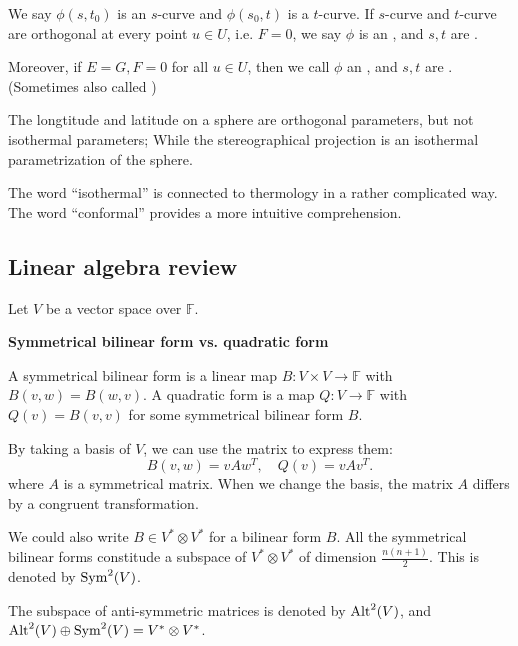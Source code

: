 
We say $\phi(s,t_0)$ is an $s$-curve and $\phi(s_0,t)$ is a $t$-curve.
If $s$-curve and $t$-curve are orthogonal at every point $u\in U$,
i.e. $F = 0$,
we say  $\phi$ is an ,
and $s,t$ are .

Moreover, if $E=G, F=0$ for all  $u\in U$, then we call  $\phi$ an
, and  $s,t$ are .
(Sometimes also called )

\begin{example}
    The longtitude and latitude on a sphere are orthogonal parameters,
	but not isothermal parameters;
	While the stereographical projection is an isothermal parametrization of the sphere.
\end{example}

\begin{remark}
    The word ``isothermal'' is connected to thermology in a rather complicated way.
	The word ``conformal'' provides a more intuitive comprehension.
\end{remark}

\subsection{Linear algebra review}
\label{sub:Linear algebra review}

Let $V$ be a vector space over $\mathbb{F}$.

\textbf{Symmetrical bilinear form vs. quadratic form}

A symmetrical bilinear form is a linear map $B: V\times V\to \mathbb{F}$
with $B(v,w)=B(w,v)$.
A quadratic form is a map $Q:V\to \mathbb{F}$ with $Q(v) = B(v,v)$ for
some symmetrical bilinear form  $B$.

By taking a basis of $V$, we can use the matrix to express them:
 \[
B(v,w) = vAw^T, \quad Q(v) = vAv^T.
\]
where $A$ is a symmetrical matrix.
When we change the basis, the matrix  $A$ differs by a congruent transformation.

We could also write $B\in V^*\otimes V^*$ for a bilinear form $B$.
All the symmetrical bilinear forms constitude a subspace of  $V^*\otimes V^*$
of dimension  $\frac{n(n+1)}{2}$. This is denoted by $\operatorname{Sym}^2(V)$.
\begin{remark}
    The subspace of anti-symmetric matrices is denoted by $\operatorname{Alt}^2(V)$,
	and  $\operatorname{Alt}^2(V)\oplus \operatorname{Sym}^2(V) = V^*\otimes V^*$.
\end{remark}

